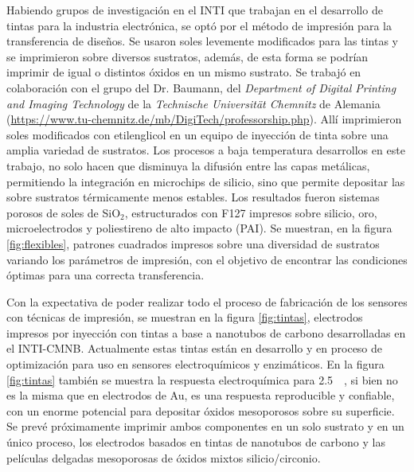 	  Habiendo grupos de investigación en el INTI que trabajan en el desarrollo de tintas para la industria electrónica, se optó por el método de impresión para la transferencia de diseños. Se usaron soles levemente modificados para las tintas y se imprimieron sobre diversos sustratos, además, de esta forma se podrían imprimir \pdm\space de igual o distintos óxidos en un mismo sustrato. Se trabajó en colaboración con el grupo del Dr. Baumann, del \textit{Department of Digital Printing and Imaging Technology} de la \textit{Technische Universität Chemnitz} de Alemania (\url{https://www.tu-chemnitz.de/mb/DigiTech/professorship.php}). Allí imprimieron soles modificados con etilenglicol en un equipo de inyección de tinta sobre una amplia variedad de sustratos. Los procesos a baja temperatura desarrollos en este trabajo, no solo hacen que disminuya la difusión entre las capas metálicas, permitiendo la integración en microchips de silicio, sino que permite depositar las \pdm\space sobre sustratos térmicamente menos estables. Los resultados fueron sistemas porosos de soles de SiO$_2$, estructurados con F127 impresos sobre silicio, oro, microelectrodos y poliestireno de alto impacto (PAI). Se muestran, en la figura \ref{fig:flexibles}, patrones cuadrados impresos sobre una diversidad de sustratos variando los parámetros de impresión, con el objetivo de encontrar las condiciones óptimas para una correcta transferencia.

 	  Con la expectativa de poder realizar todo el proceso de fabricación de los sensores con técnicas de impresión, se muestran en la figura \ref{fig:tintas}, electrodos impresos por inyección con tintas a base a nanotubos de carbono desarrolladas en el INTI-CMNB. Actualmente estas tintas están en desarrollo y en proceso de optimización para uso en sensores electroquímicos y enzimáticos\cite{longinotti2010,Mass2016}. En la figura \ref{fig:tintas} también se muestra la respuesta electroquímica para \fe\space \SI{2.5}{\milli\Molar}, si bien no es la misma que en electrodos de Au, es una respuesta reproducible y confiable, con un enorme potencial para depositar óxidos mesoporosos sobre su superficie. Se prevé próximamente imprimir ambos componentes en un solo sustrato y en un único proceso, los electrodos basados en tintas de nanotubos de carbono y las películas delgadas mesoporosas de óxidos mixtos silicio/circonio.

